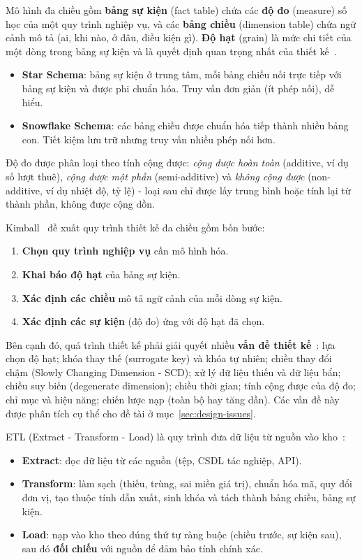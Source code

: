 Mô hình đa chiều gồm \textbf{bảng sự kiện} (fact table) chứa các \textbf{độ đo} (measure) số học của một quy trình nghiệp vụ, và các \textbf{bảng chiều} (dimension table) chứa ngữ cảnh mô tả (ai, khi nào, ở đâu, điều kiện gì). \textbf{Độ hạt} (grain) là mức chi tiết của một dòng trong bảng sự kiện và là quyết định quan trọng nhất của thiết kế~\cite{kimball}.
\begin{itemize}
    \item \textbf{Star Schema}: bảng sự kiện ở trung tâm, mỗi bảng chiều nối trực tiếp với bảng sự kiện và được phi chuẩn hóa. Truy vấn đơn giản (ít phép nối), dễ hiểu.
    \item \textbf{Snowflake Schema}: các bảng chiều được chuẩn hóa tiếp thành nhiều bảng con. Tiết kiệm lưu trữ nhưng truy vấn nhiều phép nối hơn.
\end{itemize}
Độ đo được phân loại theo tính cộng được: \textit{cộng được hoàn toàn} (additive, ví dụ số lượt thuê), \textit{cộng được một phần} (semi-additive) và \textit{không cộng được} (non-additive, ví dụ nhiệt độ, tỷ lệ) - loại sau chỉ được lấy trung bình hoặc tính lại từ thành phần, không được cộng dồn.

\label{sec:theory-design}
Kimball~\cite{kimball} đề xuất quy trình thiết kế đa chiều gồm bốn bước:
\begin{enumerate}
    \item \textbf{Chọn quy trình nghiệp vụ} cần mô hình hóa.
    \item \textbf{Khai báo độ hạt} của bảng sự kiện.
    \item \textbf{Xác định các chiều} mô tả ngữ cảnh của mỗi dòng sự kiện.
    \item \textbf{Xác định các sự kiện} (độ đo) ứng với độ hạt đã chọn.
\end{enumerate}
Bên cạnh đó, quá trình thiết kế phải giải quyết nhiều \textbf{vấn đề thiết kế}~\cite{inmon,kimball}: lựa chọn độ hạt; khóa thay thế (surrogate key) và khóa tự nhiên; chiều thay đổi chậm (Slowly Changing Dimension - SCD); xử lý dữ liệu thiếu và dữ liệu bẩn; chiều suy biến (degenerate dimension); chiều thời gian; tính cộng được của độ đo; chỉ mục và hiệu năng; chiến lược nạp (toàn bộ hay tăng dần). Các vấn đề này được phân tích cụ thể cho đề tài ở mục~\ref{sec:design-issues}.

ETL (Extract - Transform - Load) là quy trình đưa dữ liệu từ nguồn vào kho~\cite{kimball}:
\begin{itemize}
    \item \textbf{Extract}: đọc dữ liệu từ các nguồn (tệp, CSDL tác nghiệp, API).
    \item \textbf{Transform}: làm sạch (thiếu, trùng, sai miền giá trị), chuẩn hóa mã, quy đổi đơn vị, tạo thuộc tính dẫn xuất, sinh khóa và tách thành bảng chiều, bảng sự kiện.
    \item \textbf{Load}: nạp vào kho theo đúng thứ tự ràng buộc (chiều trước, sự kiện sau), sau đó \textbf{đối chiếu} với nguồn để đảm bảo tính chính xác.
\end{itemize}

